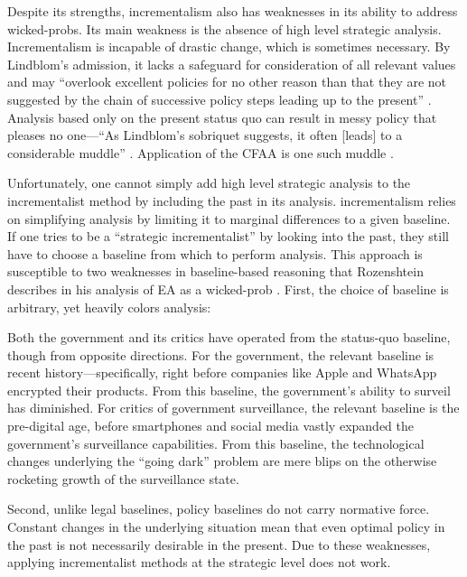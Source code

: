 Despite its strengths, \ac{incrementalism} also has weaknesses in its ability to address \acp{wicked-prob}. Its main
weakness is the absence of high level strategic analysis. Incrementalism is incapable of drastic change, which is
sometimes necessary. By Lindblom's admission, it lacks a safeguard for consideration of all relevant values and may
``overlook excellent policies for no other reason than that they are not suggested by the chain of successive policy
steps leading up to the present'' \cite{lindblom_muddling_1959}. Analysis based only on the present status quo can
result in messy policy that pleases no one---``As Lindblom's sobriquet suggests, it often [leads] to a considerable
muddle'' \cite{feeley_judicial_2000}. Application of the \acl{CFAA} is one such muddle \cite{wolff_computer_2016}.

Unfortunately, one cannot simply add high level strategic analysis to the incrementalist method by including the past in
its analysis. \Ac{incrementalism} relies on simplifying analysis by limiting it to marginal differences to a given
baseline. If one tries to be a ``strategic incrementalist'' by looking into the past, they still have to choose a
baseline from which to perform analysis. This approach is susceptible to two weaknesses in baseline-based reasoning that
Rozenshtein describes in his analysis of \ac{EA} as a \ac{wicked-prob} \cite{rozenshtein_wicked_2018}. First, the choice
of baseline is arbitrary, yet heavily colors analysis:

\begin{displayquote}
Both the government and its critics have operated from the status-quo baseline, though from opposite directions. For the
government, the relevant baseline is recent history---specifically, right before companies like Apple and WhatsApp
encrypted their products. From this baseline, the government's ability to surveil has diminished. For critics of
government surveillance, the relevant baseline is the pre-digital age, before smartphones and social media vastly
expanded the government's surveillance capabilities. From this baseline, the technological changes underlying the
``going dark'' problem are mere blips on the otherwise rocketing growth of the surveillance state.
\cite{rozenshtein_wicked_2018}
\end{displayquote}

Second, unlike legal baselines, policy baselines do not carry normative force. Constant changes in the underlying
situation mean that even optimal policy in the past is not necessarily desirable in the present. Due to these
weaknesses, applying incrementalist methods at the strategic level does not work.

